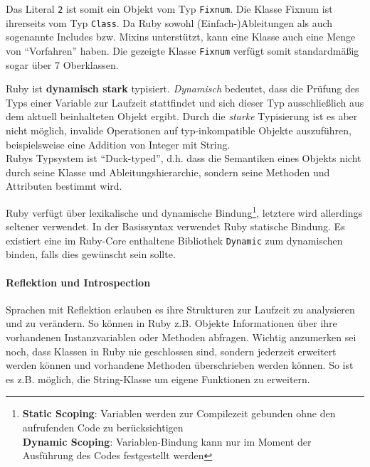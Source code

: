 Das Literal \texttt{2} ist somit ein Objekt vom Typ \texttt{Fixnum}. Die Klasse Fixnum ist ihrerseits vom Typ \texttt{Class}. Da Ruby sowohl (Einfach-)Ableitungen als auch sogenannte Includes bzw. Mixins unterstützt, kann eine Klasse auch eine Menge von "`Vorfahren"' haben. Die gezeigte Klasse \texttt{Fixnum} verfügt somit standardmäßig sogar über 7 Oberklassen.

Ruby ist \textbf{dynamisch stark} typisiert. \textit{Dynamisch} bedeutet, dass die Prüfung des Typs einer Variable zur Laufzeit stattfindet und sich dieser Typ ausschließlich aus dem aktuell beinhalteten Objekt ergibt. Durch die \textit{starke} Typisierung ist es aber nicht möglich, invalide Operationen auf typ-inkompatible Objekte auszuführen, beispielsweise eine Addition von Integer mit String. \\
Rubys Typsystem ist "`Duck-typed"', d.h. dass die Semantiken eines Objekts nicht durch seine Klasse und Ableitungshierarchie, sondern seine Methoden und Attributen bestimmt wird.

Ruby verfügt über lexikalische und dynamische Bindung\footnote{
\textbf{Static Scoping}: Variablen werden zur Compilezeit gebunden ohne den aufrufenden Code zu berücksichtigen\\
\textbf{Dynamic Scoping}: Variablen-Bindung kann nur im Moment der Ausführung des Codes festgestellt werden}, letztere wird allerdings seltener verwendet. In der Basissyntax verwendet Ruby statische Bindung. Es existiert eine im Ruby-Core enthaltene Bibliothek \texttt{Dynamic} zum dynamischen binden, falls dies gewünscht sein sollte.


\paragraph{Reflektion und Introspection} Sprachen mit Reflektion erlauben es ihre Strukturen zur Laufzeit zu analysieren und zu verändern. So können in Ruby z.B. Objekte Informationen über ihre vorhandenen Instanzvariablen oder Methoden abfragen. Wichtig anzumerken sei noch, dass Klassen in Ruby nie geschlossen sind, sondern jederzeit erweitert werden können und vorhandene Methoden überschrieben werden können. So ist es z.B. möglich, die String-Klasse um eigene Funktionen zu erweitern. 

